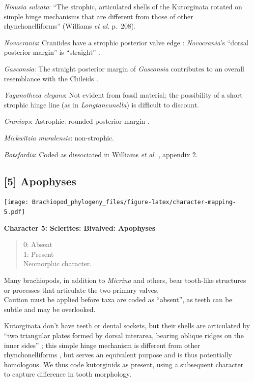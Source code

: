 \documentclass[]{book}
\theoremstyle{definition}
\theoremstyle{definition}
\theoremstyle{definition}
\theoremstyle{remark}
\begin{document}
\emph{Nisusia sulcata}: ``The strophic, articulated shells of the
Kutorginata rotated on simple hinge mechanisms that are different from
those of other rhynchonelliforms'' (Williams \emph{et al}. p.~208).

\emph{Novocrania}: Craniides have a strophic posterior valve edge
\citep[table 39 on p.~2853]{Williams2007PartH}: \emph{Novocrania}'s
``dorsal posterior margin'' is ``straight''
\citep[p.~171]{Williams2000BrachiopodaLinguliformea}.

\emph{Gasconsia}: The straight posterior margin of \emph{Gasconsia}
contributes to an overall resemblance with the Chileids
\citep{Holmer2014OrdovicianSilurian}.

\emph{Yuganotheca elegans}: Not evident from fossil material; the
possibility of a short strophic hinge line (as in \emph{Longtancunella})
is difficult to discount.

\emph{Craniops}: Astrophic: rounded posterior margin \citep[see fig. 91
in][]{Williams2000BrachiopodaLinguliformea}.

\emph{Mickwitzia muralensis}: non-strophic.

\emph{Botsfordia}: Coded as dissociated in Williams \emph{et al}.
\citeyearpar{Williams1998Thediversity}, appendix 2.

\hypertarget{apophyses}{%
\subsection*{{[}5{]} Apophyses}\label{apophyses}}

\texttt{[image: Brachiopod\_phylogeny\_files/figure-latex/character-mapping-5.pdf]}

\textbf{Character 5: Sclerites: Bivalved: Apophyses}

\begin{quote}
0: Absent\\
1: Present\\
Neomorphic character.
\end{quote}

Many brachiopods, in addition to \emph{Micrina} and others, bear
tooth-like structures or processes that articulate the two primary
valves.\\
Caution must be applied before taxa are coded as ``absent'', as teeth
can be subtle and may be overlooked.

Kutorginata don't have teeth or dental sockets, but their shells are
articulated by ``two triangular plates formed by dorsal interarea,
bearing oblique ridges on the inner sides''
\citep[p.~211]{Williams2000BrachiopodaLinguliformea}; this simple hinge
mechanism is different from other rhynchonelliforms
\citep[p.208]{Williams2000BrachiopodaLinguliformea}, but serves an
equivalent purpose and is thus potentially homologous. We thus code
kutorginids as present, using a subsequent character to capture
difference in tooth morphology.
\end{document}
